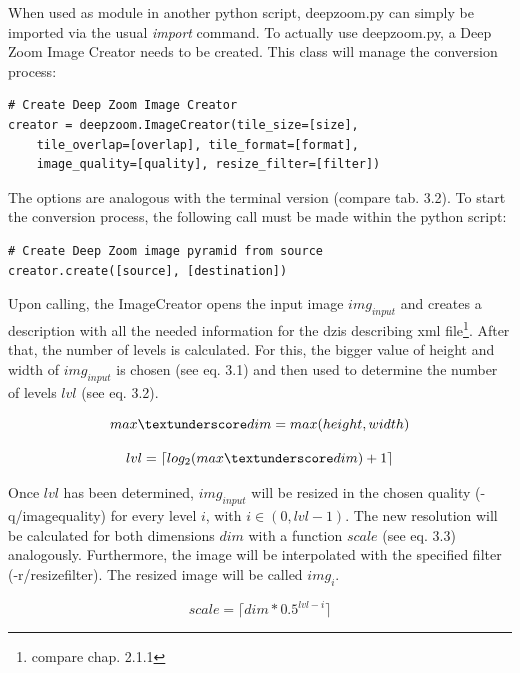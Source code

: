 When used as module in another python script, deepzoom.py can simply be imported via the usual \emph{import} command. To actually use deepzoom.py, a Deep Zoom Image Creator needs to be created. This class will manage the conversion process:

\begin{lstlisting}[frame=single]
# Create Deep Zoom Image Creator
creator = deepzoom.ImageCreator(tile_size=[size], 
	tile_overlap=[overlap],	tile_format=[format], 
	image_quality=[quality], resize_filter=[filter])
\end{lstlisting}

The options are analogous with the terminal version (compare tab. 3.2). To start the conversion process, the following call must be made within the python script:

\begin{lstlisting}[frame=single]
# Create Deep Zoom image pyramid from source
creator.create([source], [destination])
\end{lstlisting}

Upon calling, the ImageCreator opens the input image $img_{input}$ and creates a description with all the needed information for the dzis describing xml file\footnote{compare chap. 2.1.1}. After that, the number of levels is calculated. For this, the bigger value of height and width of $img_{input}$ is chosen (see eq. 3.1) and then used to determine the number of levels $lvl$ (see eq. 3.2).

\begin{equation}
	max{\textunderscore}dim = max(height, width)
\end{equation}

\begin{equation}
	lvl = {\lceil}log_2(max{\textunderscore}dim) + 1\rceil
\end{equation}

Once $lvl$ has been determined, $img_{input}$ will be resized in the chosen quality (-q/image{\textunderscore}quality) for every level $i$, with $i \in (0, lvl-1)$. The new resolution will be calculated for both dimensions $dim$ with a function $scale$ (see eq. 3.3) analogously. Furthermore, the image will be interpolated with the specified filter (-r/resize{\textunderscore}filter). The resized image will be called $img_i$.

\begin{equation}
	scale = {\lceil}dim * 0.5^{lvl-i}\rceil
\end{equation}

